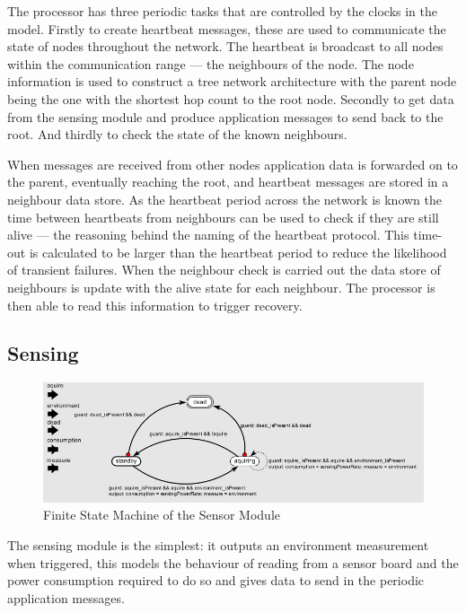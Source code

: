 \documentclass[authoryearcitations]{UoYCSproject}
\begin{document}
The processor has three periodic tasks that are controlled by the clocks in the model. Firstly to create heartbeat messages, these are used to communicate the state of nodes throughout the network. The heartbeat is broadcast to all nodes within the communication range --- the neighbours of the node. The node information is used to construct a tree network architecture with the parent node being the one with the shortest hop count to the root node. Secondly to get data from the sensing module and produce application messages to send back to the root. And thirdly to check the state of the known neighbours.

When messages are received from other nodes application data is forwarded on to the parent, eventually reaching the root, and heartbeat messages are stored in a neighbour data store. As the heartbeat period across the network is known the time between heartbeats from neighbours can be used to check if they are still alive --- the reasoning behind the naming of the heartbeat protocol. This time-out is calculated to be larger than the heartbeat period to reduce the likelihood of transient failures. When the neighbour check is carried out the data store of neighbours is update with the alive state for each neighbour. The processor is then able to read this information to trigger recovery.

\subsection{Sensing}

\begin{figure}
 \centering
    \includegraphics[width=\textwidth]{figures/sensor_Controller.png}
    \caption{Finite State Machine of the Sensor Module}
    \label{fig:sensorControl}
\end{figure}

The sensing module is the simplest: it outputs an environment measurement when triggered, this models the behaviour of reading from a sensor board and the power consumption required to do so and gives data to send in the periodic application messages.
\end{document}
